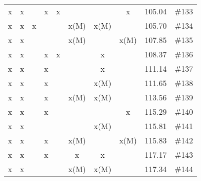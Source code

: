 \begin{longtable}{|c|c|c|c|c|c|c|c|c|c|}
 x    & x    &      & x    & x    &      &      & x    & 105.04 & \#133 \\
 x    & x    & x    &      &      & x(M) & x(M) &      & 105.70 & \#134 \\
 x    & x    &      &      &      & x(M) &      & x(M) & 107.85 & \#135 \\
 x    & x    &      & x    & x    &      & x    &      & 108.37 & \#136 \\
 x    & x    &      & x    &      &      & x    &      & 111.14 & \#137 \\
 x    & x    &      & x    &      &      & x(M) &      & 111.65 & \#138 \\
 x    & x    &      & x    &      & x(M) & x(M) &      & 113.56 & \#139 \\
 x    & x    &      & x    &      &      &      & x    & 115.29 & \#140 \\
 x    & x    &      &      &      &      & x(M) &      & 115.81 & \#141 \\
 x    & x    &      & x    &      & x(M) &      & x(M) & 115.83 & \#142 \\
 x    & x    &      & x    &      & x    & x    &      & 117.17 & \#143 \\
 x    & x    &      &      &      & x(M) & x(M) &      & 117.34 & \#144 \\
\end{longtable}
\normalsize